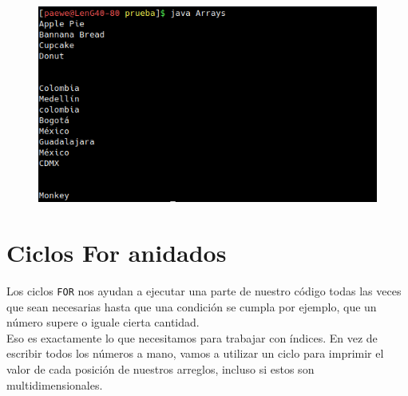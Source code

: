 \documentclass{article}
\begin{document}
\begin{figure}[h!]
  \centering
  \includegraphics[scale=0.75]{./Pictures/057_arrays.png}
\end{figure}


\section{Ciclos For anidados}%
Los ciclos \texttt{FOR} nos ayudan a ejecutar una parte de nuestro código todas
las veces que sean necesarias hasta que una condición se cumpla por ejemplo,
que un número supere o iguale cierta cantidad.\\

Eso es exactamente lo que necesitamos para trabajar con índices. En vez de
escribir todos los números a mano, vamos a utilizar un ciclo para imprimir el
valor de cada posición de nuestros arreglos, incluso si estos son
multidimensionales.\\
\end{document}
